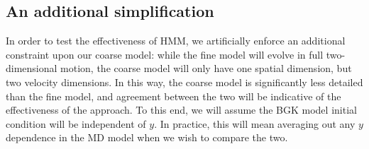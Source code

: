 \documentclass{article}
\begin{document}
\subsection{An additional simplification}

In order to test the effectiveness of HMM, we artificially enforce an additional constraint upon our coarse model: while the fine model will evolve in full two-dimensional motion, the coarse model will only have one spatial dimension, but two velocity dimensions. In this way, the coarse model is significantly less detailed than the fine model, and agreement between the two will be indicative of the effectiveness of the approach. To this end, we will assume the BGK model initial condition will be independent of $y$. In practice, this will mean averaging out any $y$ dependence in the MD model when we wish to compare the two.
\end{document}
